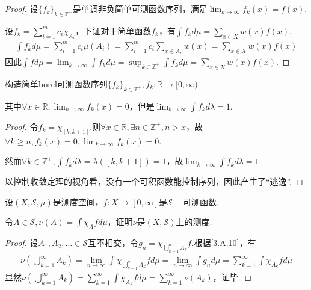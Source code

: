 \begin{proof}
    设\(\{f_k\}_{k \in \mathbb{Z}^+}\)是单调非负简单可测函数序列，满足\(\lim_{k \to \infty}f_k(x)=f(x)\).
    
    设\(f_k=\sum_{i=1}^m c_i \chi_{A_i}\)，下证对于简单函数\(f_k\)，有\(\int f_k d\mu=\sum_{x \in X}w(x)f(x)\).
    \begin{align*}
        \int f_k d\mu=\sum_{i=1}^m c_i\mu(A_i)=\sum_{i=1}^m c_i \sum_{x \in A_i}w(x)=\sum_{x \in X}w(x)f(x)
    \end{align*}
    因此\(\int f d\mu=\lim_{k \to \infty} \int f_k d\mu=\sup_{k \in \mathbb{Z}^+} \int f_k d\mu=\sum_{x \in X}w(x)f(x)\).
\end{proof}

\begin{problem}[8]\label{3.A.8}
    构造简单borel可测函数序列\(\{f_k\}_{k \in \mathbb{Z}^+}, f_k: \mathbb{R} \to [0,\infty)\).

    其中\(\forall x \in \mathbb{R}, \lim_{k \to \infty} f_k(x)=0\)，但是\(\lim_{k \to \infty} \int f_k d\lambda=1\).
\end{problem}

\begin{proof}
    令\(f_k=\chi_{[k,k+1]}\).则\(\forall x \in \mathbb{R}, \exists n \in \mathbb{Z}^+, n>x\)，故\(\forall k \geq n, f_k(x)=0, \lim_{k \to \infty} f_k(x)=0\).

    然而\(\forall k \in \mathbb{Z}^+, \int f_k d\lambda=\lambda([k,k+1])=1\)，故\(\lim_{k \to \infty} \int f_k d\lambda=1\).

    {\kaishu 以控制收敛定理的视角看，没有一个可积函数能控制序列，因此产生了“逃逸”.}
\end{proof}

\begin{problem}[9]\label{3.A.9}
    设\((X, \mathcal{S}, \mu)\)是测度空间，\(f: X \to [0,\infty]\)是\(\mathcal{S}-\)可测函数.

    令\(A \in \mathcal{S}, \nu(A)=\int \chi_A f d\mu\)，证明\(\nu\)是\((X, \mathcal{S})\)上的测度.
\end{problem}

\begin{proof}
    设\(A_1, A_2, \dots \in \mathcal{S}\)互不相交，令\(g_n=\chi_{\bigcup_{k=1}^n A_k} f\).根据\cref{3.A.10}，有
    \begin{align*}
        \nu(\bigcup_{k=1}^\infty A_k)=\lim_{n \to \infty} \int \chi_{\bigcup_{k=1}^n A_k} f d\mu=\lim_{n \to \infty} \int g_n d\mu
        =\sum_{k=1}^\infty \int \chi_{A_k} f d\mu
    \end{align*}
    显然\(\nu(\bigcup_{k=1}^\infty A_k)=\sum_{k=1}^\infty \int \chi_{A_k} f d\mu=\sum_{k=1}^\infty \nu(A_k)\)，证毕.
\end{proof}

